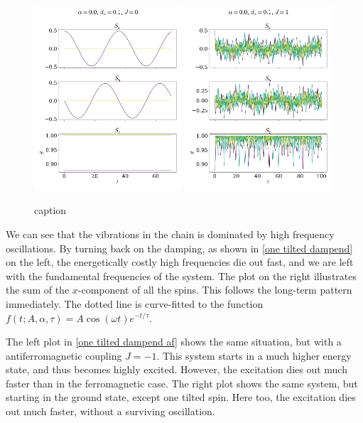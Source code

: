 \documentclass{article}
\begin{document}
    \begin{figure}[H]
        \centering
        \includegraphics[width=0.49\textwidth]{../plots/2221.pdf}
        \includegraphics[width=0.49\textwidth]{../plots/2222.pdf}
        \caption{caption}
        \label{one tilted}
    \end{figure}

    We can see that the vibrations in the chain is dominated by high frequency oscillations. By turning back on the damping, as shown in \autoref{one tilted dampend} on the left, the energetically costly high frequencies die out fast, and we are left with the fundamental frequencies of the system. The plot on the right illustrates the sum of the $x$-component of all the spins. This follows the long-term pattern immediately. The dotted line is curve-fitted to the function $f(t; A, \alpha, \tau) = A \cos(\omega t) e^{-t/\tau}$.

    The left plot in \autoref{one tilted dampend af} shows the same situation, but with a antiferromagnetic coupling $J = -1$. This system starts in a much higher energy state, and thus becomes highly excited. However, the excitation dies out much faster than in the ferromagnetic case. The right plot shows the same system, but starting in the ground state, except one tilted spin. Here too, the excitation dies out much faster, without a surviving oscillation.
\end{document}
